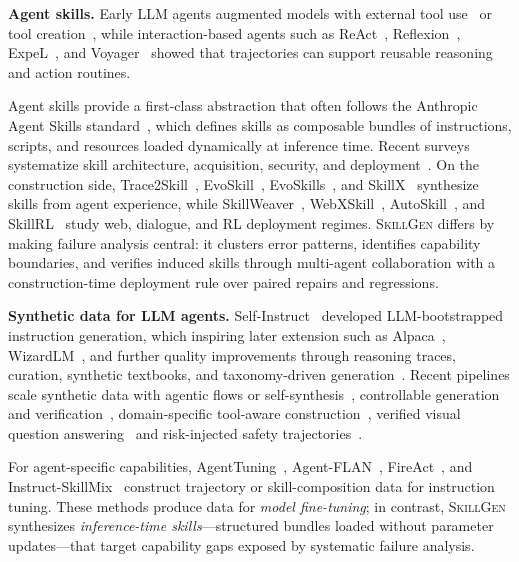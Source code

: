 \documentclass{article}
\begin{document}
\noindent\textbf{Agent skills.}
Early LLM agents augmented models with external tool use~\citep{schick2023toolformer,qin2024toolllm} or tool creation~\citep{qian2023creator}, while interaction-based agents such as ReAct~\citep{yao2023react}, Reflexion~\citep{shinn2023reflexion}, ExpeL~\citep{zhao2024expel}, and Voyager~\citep{wang2023voyager} showed that trajectories can support reusable reasoning and action routines.

Agent skills provide a first-class abstraction that often follows the Anthropic Agent Skills standard~\citep{zhang2025agentskills,anthropic2025skills}, which defines skills as composable bundles of instructions, scripts, and resources loaded dynamically at inference time.
Recent surveys systematize skill architecture, acquisition, security, and deployment~\citep{xu2026agentskillsurvey,jiang2026sok}.
On the construction side, Trace2Skill~\citep{ni2026trace2skill}, EvoSkill~\citep{alzubi2026evoskill}, EvoSkills~\citep{zhang2026evoskills}, and SkillX~\citep{wang2026skillx} synthesize skills from agent experience, while SkillWeaver~\citep{zheng2025skillweaver}, WebXSkill~\citep{wang2026webxskill}, AutoSkill~\citep{yang2026autoskill}, and SkillRL~\citep{xia2026skillrl} study web, dialogue, and RL deployment regimes.
\textsc{SkillGen} differs by making failure analysis central: it clusters error patterns, identifies capability boundaries, and verifies induced skills through multi-agent collaboration with a construction-time deployment rule over paired repairs and regressions.

\noindent\textbf{Synthetic data for LLM agents.}
Self-Instruct~\citep{wang2023selfinstruct} developed LLM-bootstrapped instruction generation, which inspiring later extension such as Alpaca~\citep{taori2023alpaca}, WizardLM~\citep{xu2024wizardlm}, and further quality improvements through reasoning traces, curation, synthetic textbooks, and taxonomy-driven generation~\citep{mukherjee2023orca,zhou2023lima,gunasekar2023textbooks,li2024glan}.
Recent pipelines scale synthetic data with agentic flows or self-synthesis~\citep{mitra2024agentinstruct,xu2025magpie}, controllable generation and verification~\citep{huang2025datagen}, domain-specific tool-aware construction~\citep{huang2025chemorch}, verified visual question answering~\citep{bao2024autobench} and risk-injected safety trajectories~\citep{huang2025guardrail}.

For agent-specific capabilities, AgentTuning~\citep{zeng2024agenttuning}, Agent-FLAN~\citep{chen2024agentflan}, FireAct~\citep{chen2023fireact}, and Instruct-SkillMix~\citep{kaur2025instructskillmix} construct trajectory or skill-composition data for instruction tuning.
These methods produce data for \emph{model fine-tuning}; in contrast, \textsc{SkillGen} synthesizes \emph{inference-time skills}---structured bundles loaded without parameter updates---that target capability gaps exposed by systematic failure analysis.
\end{document}
